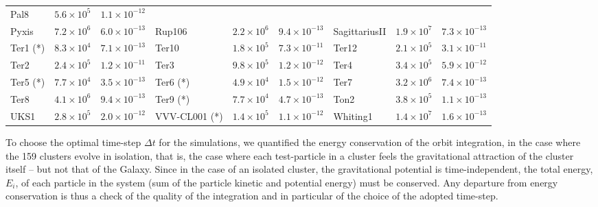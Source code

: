 \begin{table}
\begin{center}
\begin{tabular}{l | c | c | l |  c|   c | l | c | c }
                Pal8 &  $5.6\times10^5$ &          $1.1\times10^{-12}$  \\
                Pyxis &  $7.2\times10^6$ &          $6.0\times10^{-13}$  &
                Rup106 &  $2.2\times10^6 $&          $9.4\times10^{-13}$  &
        SagittariusII &  $1.9\times10^7$ &          $7.3\times10^{-13}$ \\
                Ter1 (*)&  $8.3\times10^4$ &          $7.1\times10^{-13}$  &
                Ter10 &  $1.8\times10^5 $&          $7.3\times10^{-11}$  &
                Ter12 &  $2.1\times10^5$ &          $3.1\times10^{-11}$ \\
                Ter2 &  $2.4\times10^5$ &          $1.2\times10^{-11}$  &
                Ter3 &  $9.8\times10^5$ &          $1.2\times10^{-12}$  &
                Ter4 &  $3.4\times10^5$ &          $5.9\times10^{-12}$ \\
                Ter5 (*) &  $7.7\times10^4$ &          $3.5\times10^{-13}$ &
                Ter6 (*) &  $4.9\times10^4$ &          $1.5\times10^{-12}$ &
                Ter7 &  $3.2\times10^6 $&         $ 7.4\times10^{-13}$  \\
                Ter8 &  $4.1\times10^6$ &          $9.4\times10^{-13}$ &
                Ter9 (*) &  $7.7\times10^4$ &          $4.7\times10^{-13}$  &
                Ton2 &  $3.8\times10^5 $&          $1.1\times10^{-13}$  \\
                UKS1 &  $2.8\times10^5 $&         $ 2.0\times10^{-12}$  &
            VVV-CL001 (*) &  $1.4\times10^5$ &       $   1.1\times10^{-12}$ &
            Whiting1 &  $1.4\times10^7$ &          $1.6\times10^{-13}$ \\ 
        \hline
        \end{tabular}
        \end{center}

        \end{table}
        
        To choose the optimal time-step $\Delta t$ for the simulations, we quantified the energy conservation of the orbit integration, in the case where the 159 clusters evolve in isolation, that is,  the case where each test-particle in a cluster feels the gravitational attraction of the cluster itself -- but not that of the Galaxy. Since in the case of an isolated cluster, the gravitational potential is time-independent, the total energy, $E_i$, of each particle in the system (sum of the particle kinetic and potential energy) must be conserved. Any departure from energy conservation is thus a check of the quality of the integration and in particular of the choice of the adopted time-step.

